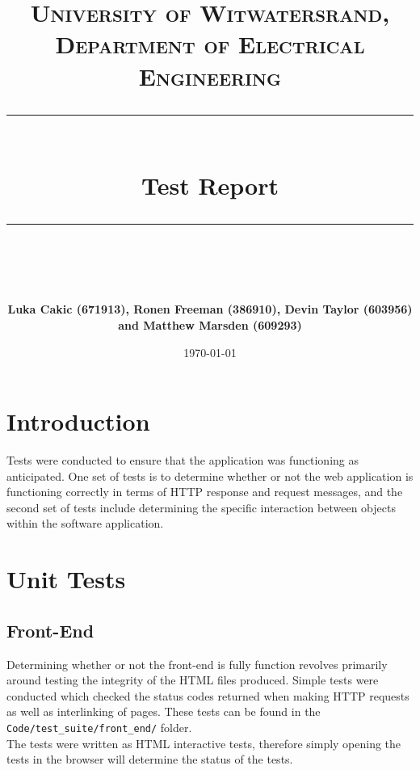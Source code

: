 \documentclass[10pt, a4paper, twocolumn]{scrartcl}
\begin{document}
 

\onecolumn

\newcommand{\horrule}[1]{\rule{\linewidth}{#1}}

	\title{\normalfont \normalsize
		\textsc{University of Witwatersrand, Department of Electrical Engineering} \\ [10pt]
		\horrule{0.5pt} \\ [10pt]
		\huge Test Report \\
		\horrule{2pt} \\ [10pt]}
	\author{\textbf{\normalsize{Luka Cakic (671913), Ronen Freeman (386910), Devin Taylor (603956) and Matthew Marsden (609293)}} \\ [10pt]}
	\date {\normalsize \today}
	
	\maketitle


\section{Introduction}

	Tests were conducted to ensure that the application was functioning as anticipated. One set of tests is to determine whether or not the web application is functioning correctly in terms of HTTP response and request messages, and the second set of tests include determining the specific interaction between objects within the software application.
	
\section{Unit Tests}

	\subsection{Front-End}
	
		Determining whether or not the front-end is fully function revolves primarily around testing the integrity of the HTML files produced. Simple tests were conducted which checked the status codes returned when making HTTP requests as well as interlinking of pages. These tests can be found in the \texttt{Code/test\_suite/front\_end/} folder. \\
		
		The tests were written as HTML interactive tests, therefore simply opening the tests in the browser will determine the status of the tests.
		
\end{document}
